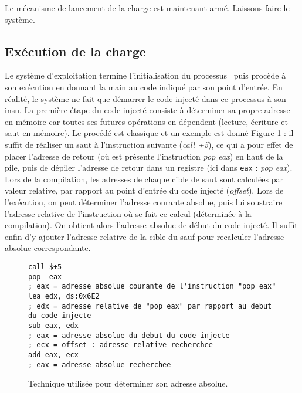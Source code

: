 Le mécanisme de lancement de la charge est maintenant armé. Laissons faire le système.


\subsection{Exécution de la charge}
Le système d'exploitation termine l'initialisation du processus \service\ puis procède à son exécution en donnant la main au code indiqué par son point d'entrée. En réalité, le système ne fait que démarrer le code injecté dans ce processus à son insu. La première étape du code injecté consiste à déterminer sa propre adresse en mémoire car toutes ses futures opérations en dépendent (lecture, écriture et saut en mémoire). Le procédé est classique et un exemple est donné Figure \ref{fig:AThierry_GetAbsoluteAddress} : il suffit de réaliser un saut à l'instruction suivante (\emph{call +5}), ce qui a pour effet de placer l'adresse de retour (où est présente l'instruction \emph{pop eax}) en haut de la pile, puis de dépiler l'adresse de retour dans un registre (ici dans \texttt{eax} : \emph{pop eax}).
Lors de la compilation, les adresses de chaque cible de saut sont calculées par valeur relative, par rapport au point d'entrée du code injecté (\emph{offset}). Lors de l'exécution, on peut déterminer l'adresse courante absolue, puis lui soustraire l'adresse relative de l'instruction où se fait ce calcul (déterminée à la compilation). On obtient alors l'adresse absolue de début du code injecté. Il suffit enfin d'y ajouter l'adresse relative de la cible du sauf pour recalculer l'adresse absolue correspondante.

\begin{figure}
\scriptsize
\begin{changemargin}{-0.6cm}{-0.6cm}
\begin{lstlisting}[language={[x86masm]Assembler}]
call $+5
pop  eax
; eax = adresse absolue courante de l'instruction "pop eax"
lea edx, ds:0x6E2
; edx = adresse relative de "pop eax" par rapport au debut du code injecte
sub eax, edx
; eax = adresse absolue du debut du code injecte
; ecx = offset : adresse relative recherchee
add eax, ecx       
; eax = adresse absolue recherchee
\end{lstlisting}
\end{changemargin}
\caption{Technique utilisée pour déterminer son adresse absolue.\label{fig:AThierry_GetAbsoluteAddress}}
\end{figure}
  
